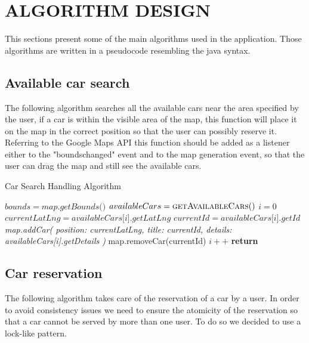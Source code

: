 \section{ALGORITHM DESIGN}

This sections present some of the main algorithms used in the application. Those algorithms are written
in a pseudocode resembling the java syntax.

\subsection{Available car search}
The following algorithm searches all the available cars near the area specified by the user, if a car
is within the visible area of the map, this function will place it on the map in the correct position
so that the user can possibly reserve it. Referring to the Google Maps API this function should be
added as a listener either to the "bounds\textunderscore changed" event and to the map generation event,
so that the user can drag the map and still see the available cars.

\begin{algorithm}
\begin{algorithmic}[1]
  \caption{\label{alg:stdreqhandler} Car Search Handling Algorithm}

    \State $ bounds = \textit{map.getBounds()} $
    \State $ availableCars = \Call {getAvailableCars} $
    \State $ i = \textit{0}$
      \State $ currentLatLng = \textit{availableCars[i].getLatLng} $
      \State $ currentId = \textit{availableCars[i].getId} $
        \State \textit{map.addCar(
          \State position: currentLatLng,
          \State title: currentId,
          \State details: availableCars[i].getDetails
        \State )}
        \State map.removeCar(currentId)
      \EndIf
      \State $ i++ $
    \EndFor
    \State \textbf{return}
  \EndFunction

\end{algorithmic}
\end{algorithm}

\pagebreak

\subsection{Car reservation}
The following algorithm takes care of the reservation of a car by a user. In order to avoid consistency
issues we need to ensure the atomicity of the reservation so that a car cannot be served by more than
one user. To do so we decided to use a lock-like pattern.


